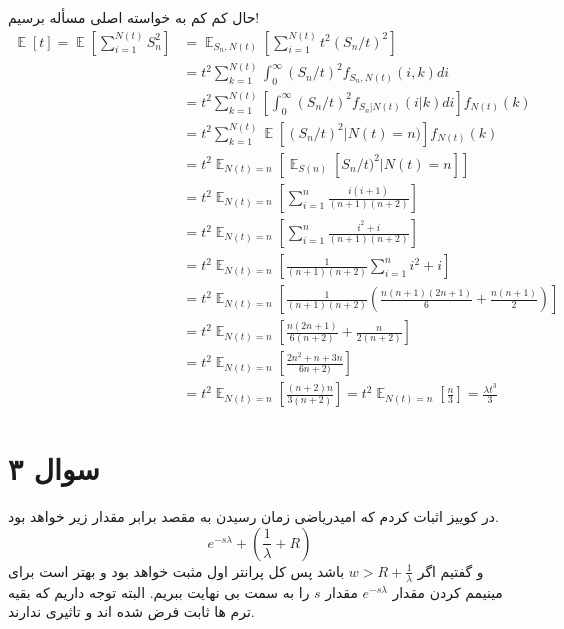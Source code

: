 \documentclass{article}[12pt]
\DeclareMathOperator{\EX}{\mathbb{E}}%
\begin{document}
حال کم کم به خواسته اصلی مسأله برسیم!
\begin{equation}
\begin{split}
\EX[t] = \EX \left[ \sum_{i=1}^{N(t)} S_n^2 \right] 
&= 
\EX_{S_n,N(t)} \left[ \sum_{i=1}^{N(t)} t^2(S_n/t)^2 \right]
\\
&= 
t^2 \sum_{k=1}^{N(t)} \int_0^{\infty} (S_n/t)^2 f_{S_n,N(t)}(i,k) di 
\\
&=t^2 \sum_{k=1}^{N(t)} \left[\int_0^{\infty} (S_n/t)^2 
f_{S_n|N(t)}(i|k)  di \right] f_{N(t)}(k)
\\
&= 
t^2 \sum_{k=1}^{N(t)} \EX \left[
(S_n/t)^2 | N(t)=n) 
\right] f_{N(t)}(k)
\\
&=
t^2 \EX_{N(t)=n} \left[
\EX_{S(n)} \left[
S_n/t)^2|N(t)=n
\right]
\right]
\\
&= 
t^2 \EX_{N(t)=n} \left[ \sum_{i=1}^{n} \frac{i(i+1)}{(n+1)(n+2)} \right] 
\\ 
&= 
t^2 \EX_{N(t)=n} \left[ \sum_{i=1}^{n} \frac{i^2+i}{(n+1)(n+2)} \right]
\\
&= 
t^2 \EX_{N(t)=n} \left[ \frac{1}{(n+1)(n+2)} \sum_{i=1}^{n}i^2+i \right] 
\\ 
&= 
 t^2 \EX_{N(t)=n} \left[ \frac{1}{(n+1)(n+2)} 
(
\frac{n(n+1)(2n+1)}{6} + \frac{n(n+1)}{2}
) 
  \right] 
  \\
  &= 
t^2 \EX_{N(t)=n} \left[ \frac{n (2n+1)}{6 (n+2)}
+ \frac{n}{2(n+2)} \right]
\\ 
&= t^2 \EX_{N(t)=n} \left[\frac{2n^2 + n + 3n }{6n+2)} \right] 
\\
&= 
t^2 \EX_{N(t)=n} \left[ 
\frac{(n+2)n}{3(n+2)} \right] = t^2 
\EX_{N(t)=n} \left[ \frac{n}{3} \right] = \frac{\lambda t^3}{3} 
\end{split}
\end{equation}

\clearpage
\section{سوال ۳}

در کوییز اثبات کردم که امیدریاضی زمان رسیدن به مقصد برابر مقدار زیر خواهد بود. 
\begin{equation}
[W - (R + \frac{1}{\lambda})] e^{-s\lambda} + 
(\frac{1}{\lambda} + R)
\end{equation}
و گفتیم اگر 
$ w > R+\frac{1}{\lambda}$
باشد پس کل پرانتر اول مثبت خواهد بود و بهتر است برای مینیمم کردن مقدار 
$ e^{-s\lambda}$
مقدار 
$s$
را به سمت بی نهایت ببریم. البته توجه داریم که بقیه ترم ها ثابت فرض شده اند و تاثیری ندارند. 
\end{document}
